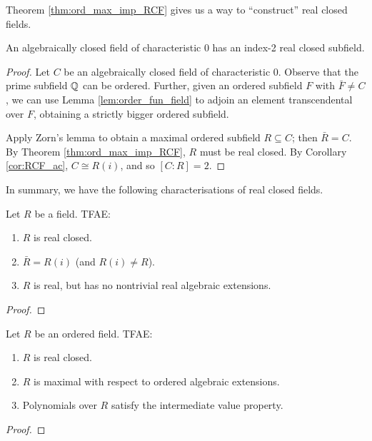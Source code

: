 Theorem \ref{thm:ord_max_imp_RCF} gives us a way to ``construct'' real closed fields.

\begin{lemma}
  \label{lem:ACF_ind_2_RCF}
  An algebraically closed field of characteristic 0 has an index-2 real closed subfield.
\end{lemma}
\begin{proof}
  Let $C$ be an algebraically closed field of characteristic 0. Observe that the prime subfield $\mathbb{Q}$ can be ordered. Further, given an ordered subfield $F$ with $\bar{F}\neq C$, we can use Lemma \ref{lem:order_fun_field} to adjoin an element transcendental over $F$, obtaining a strictly bigger ordered subfield.
  
  Apply Zorn's lemma to obtain a maximal ordered subfield $R\subseteq C$; then $\bar{R}=C$. By Theorem \ref{thm:ord_max_imp_RCF}, $R$ must be real closed. By Corollary \ref{cor:RCF_ac}, $C\cong R(i)$, and so $[C:R]=2$.
\end{proof}

In summary, we have the following characterisations of real closed fields.

\begin{theorem}
  \label{thm:RCF_tfae}
  \leanok
  Let $R$ be a field. TFAE:
  \begin{enumerate}
    \item $R$ is real closed.
    \item $\bar{R}=R(i)$ (and $R(i)\neq R$).
    \item $R$ is real, but has no nontrivial real algebraic extensions.
  \end{enumerate}
\end{theorem}
\begin{proof}
  \leanok
\end{proof}

\begin{theorem}
  \label{thm:RCF_tfae_ord}
  \leanok
  Let $R$ be an ordered field. TFAE:
  \begin{enumerate}
    \item $R$ is real closed.
    \item $R$ is maximal with respect to ordered algebraic extensions.
    \item Polynomials over $R$ satisfy the intermediate value property.
  \end{enumerate}
\end{theorem}
\begin{proof}
  \leanok
\end{proof}

